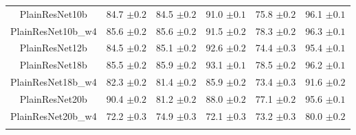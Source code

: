 \documentclass[11pt,a4paper]{article}
\begin{document}
\begin{minipage}{\linewidth}
\begin{tabular}{clllll}
 PlainResNet10b & 84.7 $\pm 0.2$ & 84.5 $\pm 0.2$  & 91.0 $\pm 0.1$ & 75.8 $\pm 0.2$ & 96.1 $\pm 0.1$ \\ 
 \vspace{0.05in}
 PlainResNet10b\_w4 & 85.6 $\pm 0.2$ & 85.6 $\pm 0.2$  & 91.5 $\pm 0.2$ & 78.3 $\pm 0.2$ & 96.3 $\pm 0.1$ \\ 
 \vspace{0.05in}
 PlainResNet12b & 84.5 $\pm 0.2$ & 85.1 $\pm 0.2$  & 92.6 $\pm 0.2$ & 74.4 $\pm 0.3$ & 95.4 $\pm 0.1$ \\ 
 \vspace{0.05in}
 PlainResNet18b & 85.5 $\pm 0.2$ & 85.9 $\pm 0.2$  & 93.1 $\pm 0.1$ & 78.5 $\pm 0.2$ & 96.2 $\pm 0.1$ \\ 
 \vspace{0.05in}
 PlainResNet18b\_w4 & 82.3 $\pm 0.2$ & 81.4 $\pm 0.2$  & 85.9 $\pm 0.2$ & 73.4 $\pm 0.3$ & 91.6 $\pm 0.2$ \\ 
 \vspace{0.05in}
 PlainResNet20b & 90.4 $\pm 0.2$ & 81.2 $\pm 0.2$  & 88.0 $\pm 0.2$ & 77.1 $\pm 0.2$ & 95.6 $\pm 0.1$ \\ 
 \vspace{0.05in}
 PlainResNet20b\_w4 & 72.2 $\pm 0.3$ & 74.9 $\pm 0.3$  & 72.1 $\pm 0.3$ & 73.2 $\pm 0.3$ & 80.0 $\pm 0.2$ \\ 
 \vspace{0.05in}
 \vspace{0.05in}
    \end{tabular}
\end{minipage}
\end{document}
